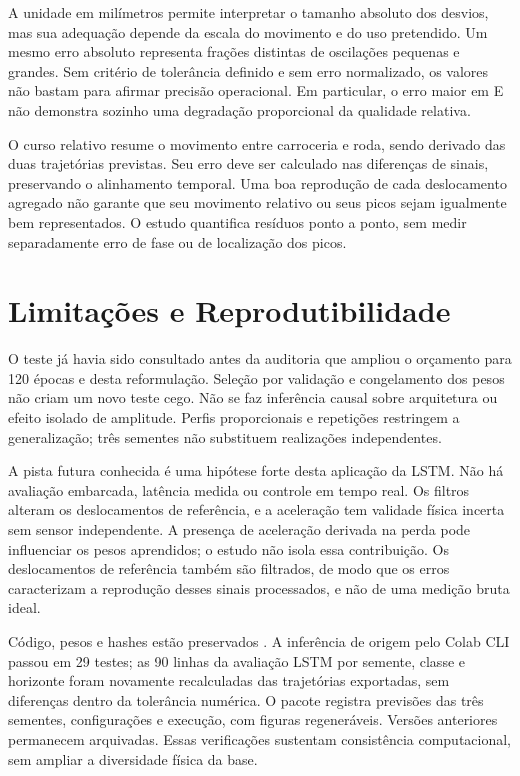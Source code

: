 \documentclass[conference]{IEEEtran}
\begin{document}
A unidade em milímetros permite interpretar o tamanho absoluto dos desvios, mas sua adequação depende da escala do movimento e do uso pretendido. Um mesmo erro absoluto representa frações distintas de oscilações pequenas e grandes. Sem critério de tolerância definido e sem erro normalizado, os valores não bastam para afirmar precisão operacional. Em particular, o erro maior em E não demonstra sozinho uma degradação proporcional da qualidade relativa.

O curso relativo resume o movimento entre carroceria e roda, sendo derivado das duas trajetórias previstas. Seu erro deve ser calculado nas diferenças de sinais, preservando o alinhamento temporal. Uma boa reprodução de cada deslocamento agregado não garante que seu movimento relativo ou seus picos sejam igualmente bem representados. O estudo quantifica resíduos ponto a ponto, sem medir separadamente erro de fase ou de localização dos picos.

\section{Limitações e Reprodutibilidade}
O teste já havia sido consultado antes da auditoria que ampliou o orçamento para 120 épocas e desta reformulação. Seleção por validação e congelamento dos pesos não criam um novo teste cego. Não se faz inferência causal sobre arquitetura ou efeito isolado de amplitude. Perfis proporcionais e repetições restringem a generalização; três sementes não substituem realizações independentes.

A pista futura conhecida é uma hipótese forte desta aplicação da LSTM. Não há avaliação embarcada, latência medida ou controle em tempo real. Os filtros alteram os deslocamentos de referência, e a aceleração tem validade física incerta sem sensor independente. A presença de aceleração derivada na perda pode influenciar os pesos aprendidos; o estudo não isola essa contribuição. Os deslocamentos de referência também são filtrados, de modo que os erros caracterizam a reprodução desses sinais processados, e não de uma medição bruta ideal.

Código, pesos e hashes estão preservados \cite{repo}. A inferência de origem pelo Colab CLI passou em 29 testes; as 90 linhas da avaliação LSTM por semente, classe e horizonte foram novamente recalculadas das trajetórias exportadas, sem diferenças dentro da tolerância numérica. O pacote registra previsões das três sementes, configurações e execução, com figuras regeneráveis. Versões anteriores permanecem arquivadas. Essas verificações sustentam consistência computacional, sem ampliar a diversidade física da base.
\end{document}
